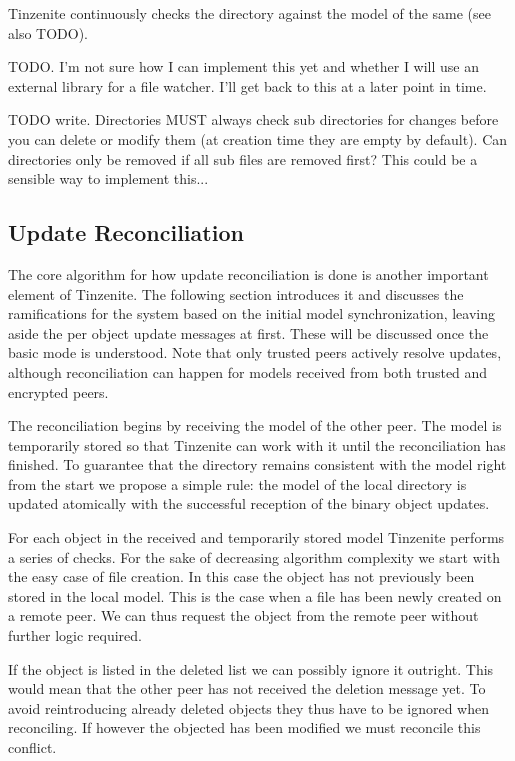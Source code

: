 Tinzenite continuously checks the directory against the model of the same (see also TODO).

TODO.
I'm not sure how I can implement this yet and whether I will use an external library for a file watcher.
I'll get back to this at a later point in time.

TODO write.
Directories MUST always check sub directories for changes before you can delete or modify them (at creation time they are empty by default).
Can directories only be removed if all sub files are removed first?
This could be a sensible way to implement this...

\subsection{Update Reconciliation}
\label{sub:Update Reconciliation}

The core algorithm for how update reconciliation is done is another important element of Tinzenite.
The following section introduces it and discusses the ramifications for the system based on the initial model synchronization, leaving aside the per object update messages at first.
These will be discussed once the basic mode is understood.
Note that only trusted peers actively resolve updates, although reconciliation can happen for models received from both trusted and encrypted peers.

The reconciliation begins by receiving the model of the other peer.
The model is temporarily stored so that Tinzenite can work with it until the reconciliation has finished.
To guarantee that the directory remains consistent with the model right from the start we propose a simple rule: the model of the local directory is updated atomically with the successful reception of the binary object updates.

For each object in the received and temporarily stored model Tinzenite performs a series of checks.
For the sake of decreasing algorithm complexity we start with the easy case of file creation.
In this case the object has not previously been stored in the local model.
This is the case when a file has been newly created on a remote peer.
We can thus request the object from the remote peer without further logic required.

If the object is listed in the deleted list we can possibly ignore it outright.
This would mean that the other peer has not received the deletion message yet.
To avoid reintroducing already deleted objects they thus have to be ignored when reconciling.
If however the objected has been modified we must reconcile this conflict.

